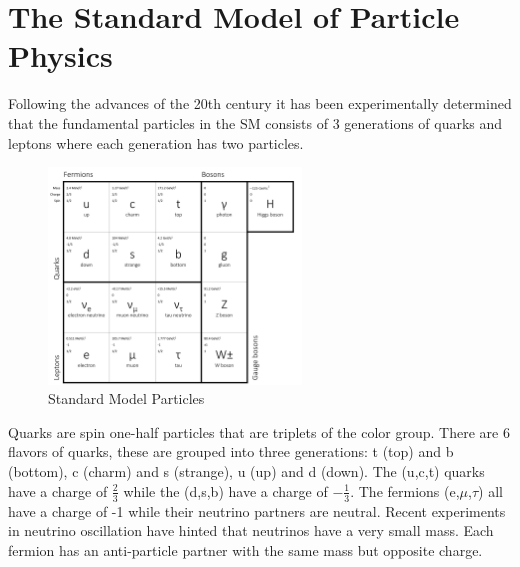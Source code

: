 
\section{The Standard Model of Particle Physics}%
Following the advances of the 20th century it has been experimentally 
determined that the fundamental
particles in the SM consists of 3 generations of quarks and leptons
where each generation has two particles. 
\begin{figure}[hb]
  \centering
	\includegraphics[width=0.6\textwidth]{images/SMParticles2.png}
  	\caption[SM Particles]
   	{Standard Model Particles}
	\label{fig:SMParticles}
\end{figure}
Quarks are spin one-half particles that are triplets of the color group. 
There are 6 flavors of quarks, these are grouped into three generations:
t (top) and b (bottom), c (charm) and s (strange), u (up) and d (down). 
The (u,c,t) quarks have a charge of $\frac{2}{3}$ while the (d,s,b) have 
a charge of $-\frac{1}{3}$.
The fermions (e,$\mu$,$\tau$) all have a charge of -1 while their neutrino 
partners are neutral. Recent experiments in neutrino oscillation have hinted
that neutrinos have a very small mass.
Each fermion has an anti-particle partner with the same mass but opposite charge.

